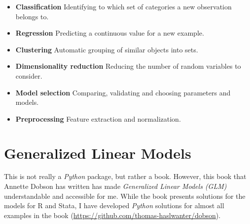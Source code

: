 \begin{itemize}
  \item \textbf{Classification}    Identifying to which set of categories a new observation belongs to.
  \item \textbf{Regression}    Predicting a continuous value for a new example.
  \item \textbf{Clustering}    Automatic grouping of similar objects into sets.
  \item \textbf{Dimensionality reduction}    Reducing the number of random variables to consider.
  \item \textbf{Model selection}    Comparing, validating and choosing parameters and models.
  \item \textbf{Preprocessing}    Feature extraction and normalization.
\end{itemize}

\section{Generalized Linear Models}

This is not really a \emph{Python} package, but rather a book. However, this book that Annette Dobson has written has made \emph{Generalized Linear Models (GLM)} \cite{Dobson2008} understandable and accessible for me. While the book presents solutions for the models for R and Stata, I have developed \emph{Python} solutions for almost all examples in the book (\url{https://github.com/thomas-haslwanter/dobson}). 